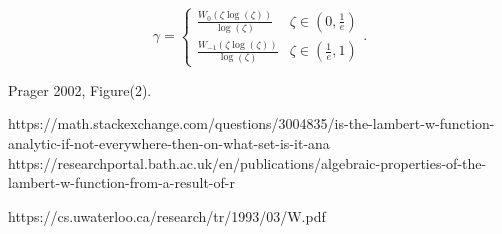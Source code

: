 \documentclass[12pt]{article}
\begin{document}
\begin{equation}
\gamma = 
\begin{cases} 
\frac{W_0\left(\zeta\log\left(\zeta\right)\right)}{\log\left(\zeta\right)} & \zeta\in\left(0, \frac{1}{e}\right)\\
\frac{W_{-1}\left(\zeta\log\left(\zeta\right)\right)}{\log\left(\zeta\right)} & \zeta\in\left(\frac{1}{e}, 1\right)
\end{cases}. 
\end{equation} 

%
Prager 2002, Figure(2).



https://math.stackexchange.com/questions/3004835/is-the-lambert-w-function-analytic-if-not-everywhere-then-on-what-set-is-it-ana
https://researchportal.bath.ac.uk/en/publications/algebraic-properties-of-the-lambert-w-function-from-a-result-of-r

%
https://cs.uwaterloo.ca/research/tr/1993/03/W.pdf

%
\end{document}
